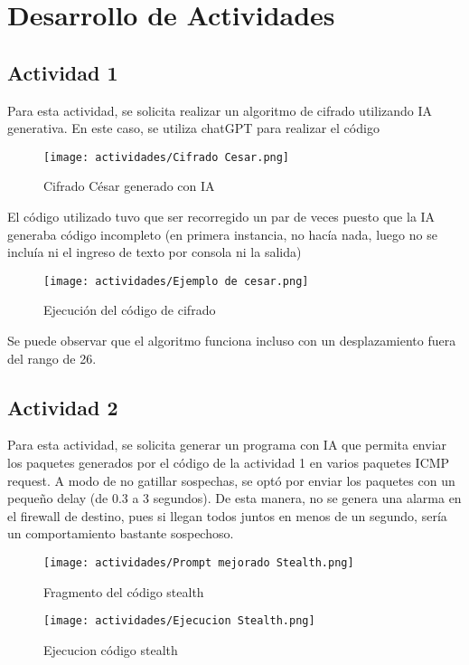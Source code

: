 \documentclass[letter,12pt]{article}
\begin{document}
\section{Desarrollo de Actividades}

\subsection{Actividad 1}
Para esta actividad, se solicita realizar un algoritmo de cifrado utilizando IA generativa. En este caso, se utiliza chatGPT para realizar el código
\begin{figure}[H]
    \centering
    \texttt{[image: actividades/Cifrado Cesar.png]}
    \caption{Cifrado César generado con IA}
    \label{fig:cifrado-chatgpt}
\end{figure}

El código utilizado tuvo que ser recorregido un par de veces puesto que la IA generaba código incompleto (en primera instancia, no hacía nada, luego no se incluía ni el ingreso de texto por consola ni la salida)
\begin{figure} [H]
    \centering
    \texttt{[image: actividades/Ejemplo de cesar.png]}
    \caption{Ejecución del código de cifrado }
    \label{fig:enter-label}
\end{figure}
Se puede observar que el algoritmo funciona incluso con un desplazamiento fuera del rango de 26.
\subsection{Actividad 2}
Para esta actividad, se solicita generar un programa con IA que permita enviar los paquetes generados por el código de la actividad 1 en varios paquetes ICMP request. A modo de no gatillar sospechas, se optó por enviar los paquetes con un pequeño delay (de 0.3 a 3 segundos). De esta manera, no se genera una alarma en el firewall de destino, pues si llegan todos juntos en menos de un segundo, sería un comportamiento bastante sospechoso.
\begin{figure} [H]
    \centering
    \texttt{[image: actividades/Prompt mejorado Stealth.png]}
    \caption{Fragmento del código stealth}
    \label{fig:enter-label}
\end{figure}

\begin{figure} [H]
    \centering
    \texttt{[image: actividades/Ejecucion Stealth.png]}
    \caption{Ejecucion código stealth}
    \label{fig:enter-label}
\end{figure}
\end{document}
